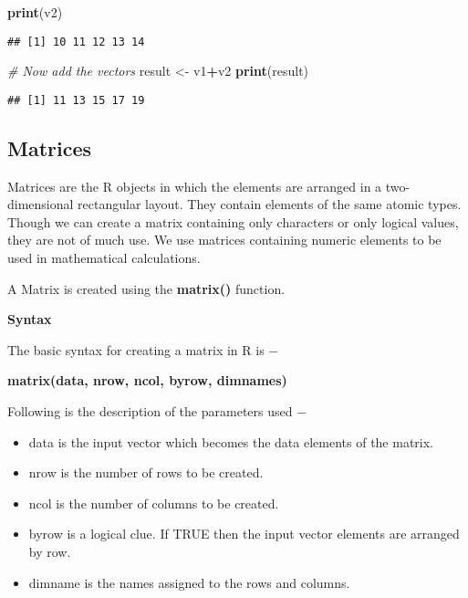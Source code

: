 \documentclass[
]{article}
\newenvironment{Shaded}{\begin{snugshade}}{\end{snugshade}}
\newcommand{\CommentTok}[1]{\textcolor[rgb]{0.56,0.35,0.01}{\textit{#1}}}
\newcommand{\FunctionTok}[1]{\textcolor[rgb]{0.13,0.29,0.53}{\textbf{#1}}}
\newcommand{\NormalTok}[1]{#1}
\newcommand{\OtherTok}[1]{\textcolor[rgb]{0.56,0.35,0.01}{#1}}
\newcommand{\SpecialCharTok}[1]{\textcolor[rgb]{0.81,0.36,0.00}{\textbf{#1}}}
\providecommand{\tightlist}{%
  \setlength{\itemsep}{0pt}\setlength{\parskip}{0pt}}
\begin{document}
\begin{Shaded}
\begin{Highlighting}[]
\FunctionTok{print}\NormalTok{(v2)}
\end{Highlighting}
\end{Shaded}

\begin{verbatim}
## [1] 10 11 12 13 14
\end{verbatim}

\begin{Shaded}
\begin{Highlighting}[]
\CommentTok{\# Now add the vectors}
\NormalTok{result }\OtherTok{\textless{}{-}}\NormalTok{ v1}\SpecialCharTok{+}\NormalTok{v2}
\FunctionTok{print}\NormalTok{(result)}
\end{Highlighting}
\end{Shaded}

\begin{verbatim}
## [1] 11 13 15 17 19
\end{verbatim}

\hypertarget{matrices}{%
\subsection{Matrices}\label{matrices}}

Matrices are the R objects in which the elements are arranged in a
two-dimensional rectangular layout. They contain elements of the same
atomic types. Though we can create a matrix containing only characters
or only logical values, they are not of much use. We use matrices
containing numeric elements to be used in mathematical calculations.

A Matrix is created using the \textbf{matrix()} function.

\textbf{Syntax}

The basic syntax for creating a matrix in R is −

\textbf{matrix(data, nrow, ncol, byrow, dimnames)}

Following is the description of the parameters used −

\begin{itemize}
\tightlist
\item
  data is the input vector which becomes the data elements of the
  matrix.
\item
  nrow is the number of rows to be created.
\item
  ncol is the number of columns to be created.
\item
  byrow is a logical clue. If TRUE then the input vector elements are
  arranged by row.
\item
  dimname is the names assigned to the rows and columns.
\end{itemize}
\end{document}
